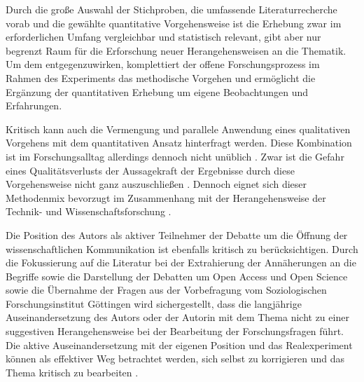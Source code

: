 Durch die große Auswahl der Stichproben, die umfassende Literaturrecherche vorab und die gewählte quantitative Vorgehensweise ist die Erhebung zwar im erforderlichen Umfang vergleichbar und statistisch relevant, gibt aber nur begrenzt Raum für die Erforschung neuer Herangehensweisen an die Thematik. Um dem entgegenzuwirken, komplettiert der offene Forschungsprozess im Rahmen des Experiments das methodische Vorgehen und ermöglicht die Ergänzung der quantitativen Erhebung um eigene Beobachtungen und Erfahrungen.

Kritisch kann auch die Vermengung und parallele Anwendung eines qualitativen Vorgehens mit dem quantitativen Ansatz hinterfragt werden. Diese Kombination ist im Forschungsalltag allerdings dennoch nicht unüblich \cite{bortz_Doering_2006_Methoden}. Zwar ist die Gefahr eines Qualitätsverlusts der Aussagekraft der Ergebnisse durch diese Vorgehensweise nicht ganz auszuschließen \cite[:198]{lamnek1993qualitative}. Dennoch eignet sich dieser Methodenmix bevorzugt im Zusammenhang mit der Herangehensweise der Technik- und Wissenschaftsforschung \cite[:8]{Brown_2014}.

Die Position des Autors als aktiver Teilnehmer der Debatte um die Öffnung der wissenschaftlichen Kommunikation ist ebenfalls kritisch zu berücksichtigen. Durch die Fokussierung auf die Literatur bei der Extrahierung der Annäherungen an die Begriffe sowie die Darstellung der Debatten um Open Access und Open Science sowie die Übernahme der Fragen aus der Vorbefragung vom Soziologischen Forschungsinstitut Göttingen wird sichergestellt, dass die langjährige Auseinandersetzung des Autors oder der Autorin mit dem Thema nicht zu einer suggestiven Herangehensweise bei der Bearbeitung der Forschungsfragen führt. Die aktive Auseinandersetzung mit der eigenen Position und das Realexperiment können als effektiver Weg betrachtet werden, sich selbst zu korrigieren und das Thema kritisch zu bearbeiten \cite{Krohn_2005}.
